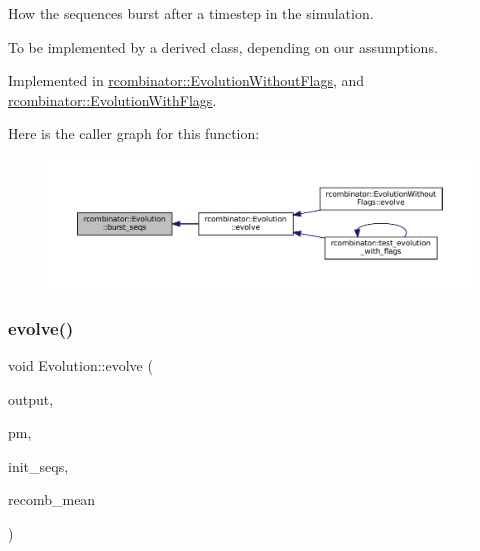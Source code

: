 How the sequences burst after a timestep in the simulation. 

To be implemented by a derived class, depending on our assumptions. 

Implemented in \mbox{\hyperlink{classrcombinator_1_1EvolutionWithoutFlags_aeba3cc75049e0590e5dcaab9558f8c56}{rcombinator\+::\+Evolution\+Without\+Flags}}, and \mbox{\hyperlink{classrcombinator_1_1EvolutionWithFlags_abad180fa8494b259e5167a13285347dd}{rcombinator\+::\+Evolution\+With\+Flags}}.

Here is the caller graph for this function\+:
\nopagebreak
\begin{figure}[H]
\begin{center}
\leavevmode
\includegraphics[width=350pt]{classrcombinator_1_1Evolution_ad4af177c458f2d6add719e64c534761a_icgraph}
\end{center}
\end{figure}
\mbox{\label{classrcombinator_1_1Evolution_a0b8a181242ea8ee3072258fa7ed416f4}} 
\subsubsection{\texorpdfstring{evolve()}{evolve()}}
{\footnotesize\ttfamily void Evolution\+::evolve (\begin{DoxyParamCaption}\item[{\mbox{\hyperlink{classrcombinator_1_1Output}{Output}} \&}]{output,  }\item[{\mbox{\hyperlink{classrcombinator_1_1PointMutator}{Point\+Mutator}} \&}]{pm,  }\item[{const std\+::vector$<$ std\+::string $>$ \&}]{init\+\_\+seqs,  }\item[{double}]{recomb\+\_\+mean }\end{DoxyParamCaption})\hspace{0.3cm}{\ttfamily [virtual]}}




